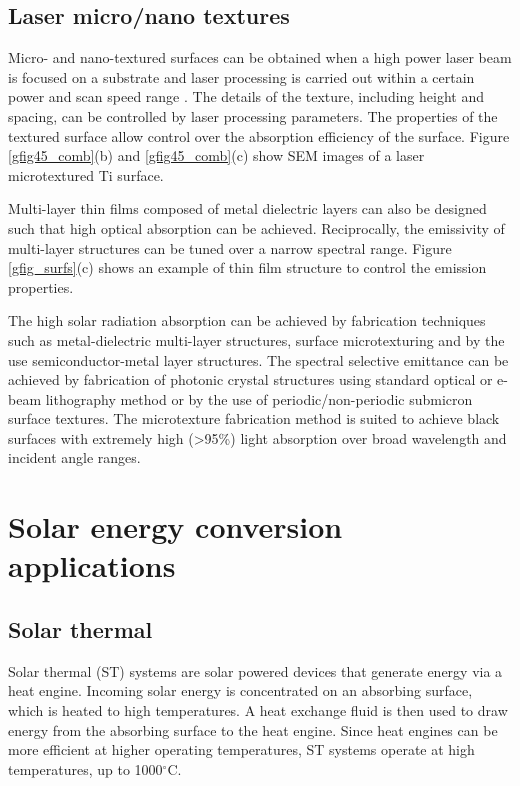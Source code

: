 \documentclass[10pt,letterpaper]{article}
\begin{document}
\subsection{Laser micro/nano textures}
Micro- and nano-textured surfaces can be obtained when a high power laser beam is 
focused on a substrate and laser processing is carried out within a certain power 
and scan speed range \cite{g28}.  The details of the texture, including height and spacing, can be controlled by laser processing parameters.  The properties of the textured surface allow control over the absorption efficiency of the surface. Figure \ref{gfig45_comb}(b) and \ref{gfig45_comb}(c) show SEM images of a laser microtextured Ti surface. 

Multi-layer thin films composed of metal dielectric layers can also be designed such that high optical absorption can be achieved.  Reciprocally, the emissivity of multi-layer structures can be tuned over a narrow spectral range. Figure \ref{gfig_surfs}(c) shows an example of thin film structure to control the emission properties. 

The high solar radiation absorption can be achieved by fabrication techniques such as metal-dielectric multi-layer structures, surface microtexturing and by the use semiconductor-metal layer structures. The spectral selective emittance can be achieved by fabrication of photonic crystal structures using standard optical or e-beam lithography method or by the use of periodic/non-periodic submicron surface textures.  The microtexture fabrication method is suited to achieve black surfaces with extremely high (\textgreater95\%) light absorption over broad wavelength and incident angle ranges.

\section{Solar energy conversion applications}
\subsection{Solar thermal}
Solar thermal (ST) systems are solar powered devices that generate energy via a heat engine.  Incoming solar energy is concentrated on an absorbing surface, which is heated to high temperatures.  A heat exchange fluid is then used to draw energy from the absorbing surface to the heat engine.  Since heat engines can be more efficient at higher operating temperatures, ST systems operate at high temperatures, up to 1000$^\circ$C.
\end{document}
